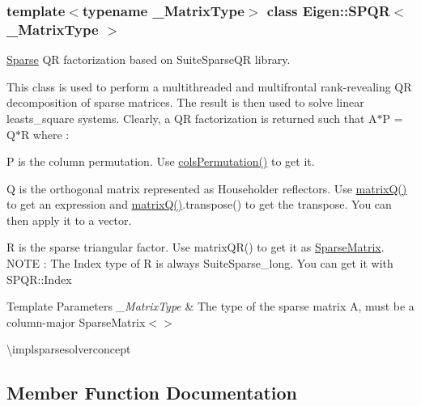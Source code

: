 \subsubsection*{template$<$typename \+\_\+\+Matrix\+Type$>$\newline
class Eigen\+::\+S\+P\+Q\+R$<$ \+\_\+\+Matrix\+Type $>$}

\mbox{\hyperlink{struct_eigen_1_1_sparse}{Sparse}} QR factorization based on Suite\+Sparse\+QR library. 

This class is used to perform a multithreaded and multifrontal rank-\/revealing QR decomposition of sparse matrices. The result is then used to solve linear leasts\+\_\+square systems. Clearly, a QR factorization is returned such that A$\ast$P = Q$\ast$R where \+:

P is the column permutation. Use \mbox{\hyperlink{class_eigen_1_1_s_p_q_r_ab1b7f54ba1cd8d77506ae676fea4fec0}{cols\+Permutation()}} to get it.

Q is the orthogonal matrix represented as Householder reflectors. Use \mbox{\hyperlink{class_eigen_1_1_s_p_q_r_a93dbf1b487e28948e1ca2a33a35b6a54}{matrix\+Q()}} to get an expression and \mbox{\hyperlink{class_eigen_1_1_s_p_q_r_a93dbf1b487e28948e1ca2a33a35b6a54}{matrix\+Q()}}.transpose() to get the transpose. You can then apply it to a vector.

R is the sparse triangular factor. Use matrix\+Q\+R() to get it as \mbox{\hyperlink{class_eigen_1_1_sparse_matrix}{Sparse\+Matrix}}. N\+O\+TE \+: The Index type of R is always Suite\+Sparse\+\_\+long. You can get it with S\+P\+Q\+R\+::\+Index


\begin{DoxyTemplParams}{Template Parameters}
{\em \+\_\+\+Matrix\+Type} & The type of the sparse matrix A, must be a column-\/major Sparse\+Matrix$<$$>$\\
\hline
\end{DoxyTemplParams}
\textbackslash{}implsparsesolverconcept 

\subsection{Member Function Documentation}
\mbox{\label{class_eigen_1_1_s_p_q_r_a8c7d48d51a1fb08a3e27b8499e5c7f49}} 
